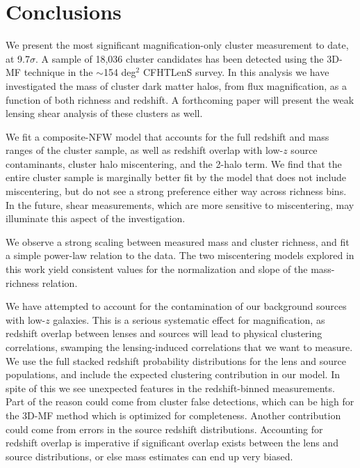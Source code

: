 
\section{Conclusions}
\label{conc}
We present the most significant magnification-only cluster measurement to date, at 9.7$\sigma$. A sample of 18,036 cluster candidates has been detected using the 3D-MF technique in the $\sim$154 deg$^2$ CFHTLenS survey. In this analysis we have investigated the mass of cluster dark matter halos, from flux magnification, as a function of both richness and redshift. A forthcoming paper will present the weak lensing shear analysis of these clusters as well.

We fit a composite-NFW model that accounts for the full redshift and mass ranges of the cluster sample, as well as redshift overlap with low-$z$ source contaminants, cluster halo miscentering, and the 2-halo term. We find that the entire cluster sample is marginally better fit by the model that does not include miscentering, but do not see a strong preference either way across richness bins. In the future, shear measurements, which are more sensitive to miscentering, may illuminate this aspect of the investigation.

We observe a strong scaling between measured mass and cluster richness, and fit a simple power-law relation to the data. The two miscentering models explored in this work yield consistent values for the normalization and slope of the mass-richness relation.

We have attempted to account for the contamination of our background sources with low-$z$ galaxies. This is a serious systematic effect for magnification, as redshift overlap between lenses and sources will lead to physical clustering correlations, swamping the lensing-induced correlations that we want to measure. We use the full stacked redshift probability distributions for the lens and source populations, and include the expected clustering contribution in our model. In spite of this we see unexpected features in the redshift-binned measurements. Part of the reason could come from cluster false detections, which can be high for the 3D-MF method which is optimized for completeness. Another contribution could come from errors in the source redshift distributions. Accounting for redshift overlap is imperative if significant overlap exists between the lens and source distributions, or else mass estimates can end up very biased.

